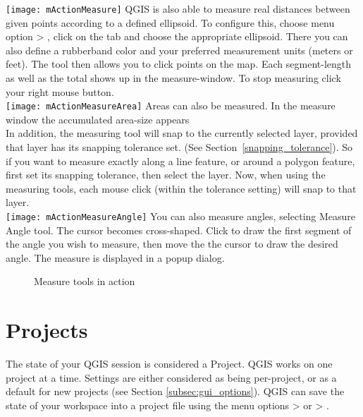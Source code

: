 \texttt{[image: mActionMeasure]} 
QGIS is also able to measure real distances between given 
points according to a defined ellipsoid. To configure this, choose menu option 
 > , 
click on the  tab and choose the appropriate ellipsoid. There
you can also define a rubberband color and your preferred measurement units
(meters or feet). The tool then allows you to click points on the map. Each
segment-length as well as the total shows up in the measure-window. To stop measuring click your right mouse button. \\
\texttt{[image: mActionMeasureArea]} Areas can also be measured. 
In the measure window the accumulated area-size appears  \\
In addition, the measuring tool will snap to the currently selected layer, provided that layer has its snapping tolerance set. (See Section~\ref{snapping_tolerance}). So if you want to measure exactly along a line feature, or around a polygon feature, first set its snapping tolerance, then select the layer. Now, when using the measuring tools, each mouse click (within the tolerance setting) will snap to that layer. \\
\texttt{[image: mActionMeasureAngle]}
You can also measure angles, selecting Measure Angle tool. The cursor becomes 
cross-shaped. Click to draw the first segment of the angle you wish to
measure, then move the the cursor to draw the desired angle. The measure
is displayed in a popup dialog. 
\begin{figure}[ht]
\centering
     \hspace{1cm}
   \caption{Measure tools in action \nixcaption} \label{fig:measure}
\end{figure}

\section{Projects}\label{sec:projects}

The state of your QGIS session is considered a Project.  QGIS
works on one project at a time.  Settings are either considered
as being per-project, or as a default for new projects (see
Section \ref{subsec:gui_options}). QGIS can save the state of your 
workspace into a project file using the menu options 
 > 
or  > .

